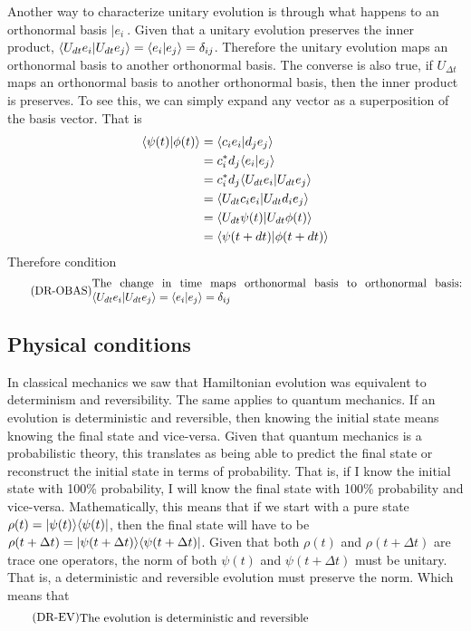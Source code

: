 Another way to characterize unitary evolution is through what happens to an orthonormal basis $|e_i\>$. Given that a unitary evolution preserves the inner product, $\langle U_{d t} e_i | U_{d t} e_j \rangle = \langle e_i | e_j \rangle = \delta_{ij}$. Therefore the unitary evolution maps an orthonormal basis to another orthonormal basis. The converse is also true, if $U_{\Delta t}$ maps an orthonormal basis to another orthonormal basis, then the inner product is preserves. To see this, we can simply expand any vector as a superposition of the basis vector. That is
\begin{equation}
	\begin{aligned}
		\langle\psi(t) | \phi(t)\rangle &= \langle c_i e_i | d_j e_j\rangle \\
		&= c_i^* d_j \langle e_i | e_j\rangle \\
		&= c_i^* d_j \langle U_{d t} e_i | U_{d t} e_j\rangle \\
		&= \langle U_{d t} c_i e_i | U_{d t} d_i e_j\rangle \\
		&= \langle U_{d t} \psi(t) | U_{d t} \phi(t)\rangle \\
		&= \langle \psi(t + d t) | \phi(t + d t)\rangle \\
	\end{aligned}
\end{equation}
Therefore condition
\begin{equation}\label{rp-qm-uev-condOrthonormalBasis}
	\tag{DR-OBAS}
	\eqtext{The change in time maps orthonormal basis to orthonormal basis: $\< U_{d t} e_i | U_{d t} e_j \> = \< e_i | e_j \> = \delta_{ij}$} 
\end{equation}

\subsection{Physical conditions}

In classical mechanics we saw that Hamiltonian evolution was equivalent to determinism and reversibility. The same applies to quantum mechanics. If an evolution is deterministic and reversible, then knowing the initial state means knowing the final state and vice-versa. Given that quantum mechanics is a probabilistic theory, this translates as being able to predict the final state or reconstruct the initial state in terms of probability. That is, if I know the initial state with 100\% probability, I will know the final state with 100\% probability and vice-versa. Mathematically, this means that if we start with a pure state $\rho(t) = |\psi(t) \rangle \langle \psi(t)|$, then the final state will have to be $\rho(t+\Delta t) = |\psi(t+\Delta t) \rangle \langle \psi(t+\Delta t)|$. Given that both $\rho(t)$ and $\rho(t + \Delta t)$ are trace one operators, the norm of both $\psi(t)$ and $\psi(t+\Delta t)$ must be unitary. That is, a deterministic and reversible evolution must preserve the norm. Which means that 
\begin{equation}\label{rp-qm-uev-condDetRev}
	\tag{DR-EV}
	\eqtext{The evolution is deterministic and reversible} 
\end{equation}

